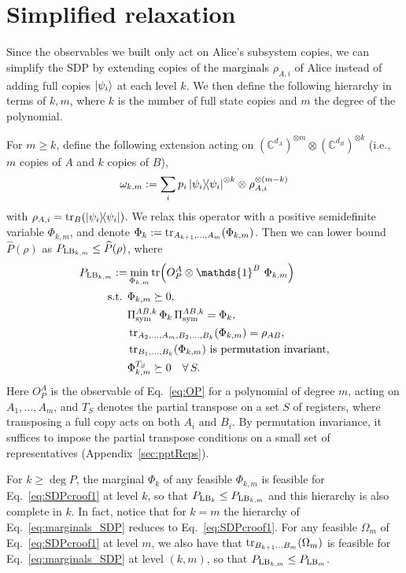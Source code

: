 \documentclass[11pt,a4paper]{report}
\newcommand{\one}{\mathds{1}}
\newcommand{\I}{\one}
\newcommand{\C}{\mathds{C}}
\begin{document}
\section{Simplified relaxation}\label{ch:simplified}
Since the observables we built only act on Alice's subsystem copies, we can simplify the SDP by extending copies of the marginals $\rho_{A,i}$ of Alice instead of adding full copies $\ket{\psi_i}$ at each level $k$. We then define the following hierarchy in terms of $k,m$, where $k$ is the number of full state copies and $m$ the degree of the polynomial.

For $m \geq k$, define the following extension acting on $(\C^{d_A})^{\otimes m}\otimes(\C^{d_B})^{\otimes k}$ (i.e., $m$ copies of $A$ and $k$ copies of $B$),
\begin{equation}\label{eq:omega_km}
    \omega_{k,m} := \sum_i p_i \dyad{\psi_i}^{\otimes k}\otimes \rho_{A,i}^{\otimes (m-k)}
\end{equation}
with $\rho_{A,i} = \tr_B(\dyad{\psi_i})$. We relax this operator with a positive semidefinite variable $\Phi_{k,m}$, and denote $\Phi_{k}:=\tr_{A_{k+1}, \dots, A_m}(\Phi_{k,m})$.
Then we can lower bound $\widehat{P}(\rho)$ as $P_{{\rm LB}_{k,m}}\leq \widehat{P}(\rho)$, where
\begin{align}\label{eq:marginals_SDP}
    P_{{\rm LB}_{k,m}}:=&\min_{\Phi_{k,m}} \tr(O_P^A \otimes \I^B \ \Phi_{k,m})\\
    \text{s.t. } & \Phi_{k,m}\succeq 0, \nonumber\\
    & \Pi_\text{sym}^{AB,k} \, \Phi_{k}\, \Pi_\text{sym}^{AB,k}= \Phi_{k},\nonumber\\
    & \tr_{A_2,\dots,A_m,B_2,\dots,B_k} (\Phi_{k,m}) = \rho_{AB}, \nonumber\\
    & \tr_{B_1,\dots,B_k}(\Phi_{k,m}) \text{ is permutation invariant},\nonumber\\
    & \Phi_{k,m}^{T_S} \succeq 0 \quad  \forall \, S.\nonumber
\end{align}
Here $O_P^A$ is the observable of Eq.~\eqref{eq:OP} for a polynomial of degree $m$, acting on $A_1,\dots,A_m$, and $T_S$ denotes the partial transpose on a set $S$ of registers, where transposing a full copy acts on both $A_i$ and $B_i$. By permutation invariance, it suffices to impose the partial transpose conditions on a small set of representatives (Appendix~\ref{sec:pptReps}).

For $k\geq\deg P$, the marginal $\Phi_k$ of any feasible $\Phi_{k,m}$ is feasible for Eq.~\eqref{eq:SDPcroof1} at level $k$, so that $P_{{\rm LB}_k}\leq P_{{\rm LB}_{k,m}}$ and this hierarchy is also complete in $k$. In fact, notice that for $k=m$ the hierarchy of Eq.~\eqref{eq:marginals_SDP} reduces to Eq.~\eqref{eq:SDPcroof1}. For any feasible $\Omega_m$ of Eq.~\eqref{eq:SDPcroof1} at level $m$, we also have that $\tr_{B_{k+1}\dots B_m}(\Omega_m)$ is feasible for Eq.~\eqref{eq:marginals_SDP} at level $(k,m)$, so that $P_{{\rm LB}_{k,m}} \leq P_{{\rm LB}_{m}}$.
\end{document}
